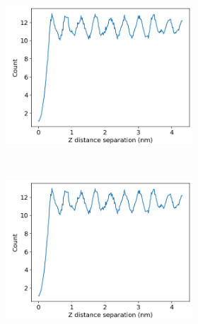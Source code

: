 \documentclass{article}
\begin{document}
\begin{figure}[ht]
\begin{subfigure}{.45\linewidth}
\begin{subfigure}{\linewidth}
		\includegraphics[width=\textwidth]{zdf_5_offset.png}
		\caption{}~\label{fig:rz_disordered}
	\end{subfigure}
        \begin{subfigure}{\linewidth}
                \centering
                \includegraphics[width=\textwidth]{zdf_5_offset.png}
                \caption{}~\label{fig:rz_disordered}
        \end{subfigure}
\end{subfigure}
\caption{}~\label{fig:zdf}
\end{figure}
\end{document}

